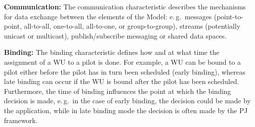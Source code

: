 \documentclass[conference,final]{IEEEtran}
\newcommand{\alnote}[1]{ {\textcolor{blue} { ***andre: #1 }}}
\newcommand{\alnote}[1]{}
\begin{document}

\textbf{Communication:} The communication characteristic describes the
mechanisms for data exchange between the elements of the Model:
e.\,g.\ messages (point-to-point, all-to-all, one-to-all, all-to-one,
or group-to-group), streams (potentially unicast or multicast),
publish/subscribe messaging or shared data spaces.
		

\textbf{Binding:} The binding characteristic defines how and at what
time the assignment of a WU to a pilot is done. For example, a WU can
be bound to a pilot either before the pilot has in turn been scheduled
(early binding), whereas late binding can occur if the WU is bound
after the pilot has been scheduled.  Furthermore, the time of binding
influences the point at which the binding decision is made, e.\,g.\ in
the case of early binding, the decision could be made by the
application, while in late binding mode the decision is often made by
the PJ framework.  %
\end{document}
